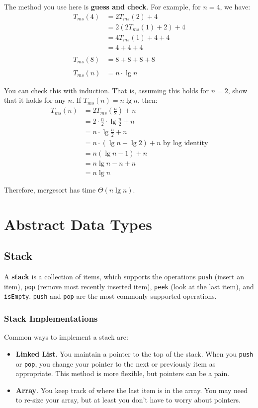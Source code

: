 \documentclass[]{article}
\theoremstyle{definition}
\begin{document}
		The method you use here is \textbf{guess and check}. For example, for $n = 4$, we have:
		\begin{align*}
			T_{ms} (4) &= 2T_{ms}(2) + 4 \\
			&= 2(2 T_{ms}(1) + 2) + 4 \\
			&= 4T_{ms}(1) + 4 + 4 \\
			&= 4 + 4 + 4
			\\ \\
			T_{ms}(8) &= 8 + 8 + 8 + 8
			\\ \\
			T_{ms}(n) &= n \cdot \lg n
		\end{align*}

		You can check this with induction. That is, assuming this holds for $n = 2$, show that it holds for any $n$. If $T_{ms}(n) = n \lg n$, then:
		\begin{align*}
			T_{ms}(n) &= 2 T_{ms}\left( \frac{n}{2} \right) + n \\
			&= 2 \cdot \frac{n}{2} \cdot \lg \frac{n}{2} + n \\
			&= n \cdot \lg \frac{n}{2} + n \\
			&= n \cdot (\lg n - \lg 2) + n \text{ by log identity} \\
			&= n(\lg n - 1) + n \\
			&= n \lg n - n + n \\
			&= n \lg n
		\end{align*}

		Therefore, mergesort has time $\Theta(n \lg n)$.
	\section{Abstract Data Types}
		\subsection{Stack}
			A \textbf{stack} is a collection of items, which supports the operations \verb+push+ (insert an item), \verb+pop+ (remove most recently inserted item), \verb+peek+ (look at the last item), and \verb+isEmpty+. \verb+push+ and \verb+pop+ are the most commonly supported operations.
			\subsubsection{Stack Implementations}
				Common ways to implement a stack are:
				\begin{itemize}
					\item \textbf{Linked List}. You maintain a pointer to the top of the stack. When you \verb+push+ or \verb+pop+, you change your pointer to the next or previously item as appropriate. This method is more flexible, but pointers can be a pain.
					\item \textbf{Array}. You keep track of where the last item is in the array. You may need to re-size your array, but at least you don't have to worry about pointers.
				\end{itemize}
\end{document}
